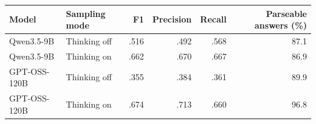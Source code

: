 {\fontsize{8.5}{9.5}\selectfont\setlength{\tabcolsep}{5pt}
\par\begin{tabularx}{\linewidth}{@{}Xlrrrr@{}}\toprule
Model & Sampling mode & F1 & Precision & Recall & Parseable answers (\%)\\\midrule
\rowcolor{blue!4}Qwen3.5-9B & Thinking off & .516 & .492 & .568 & 87.1\\
\rowcolor{blue!4}Qwen3.5-9B & Thinking on & .662 & .670 & .667 & 86.9\\
\rowcolor{orange!6}GPT-OSS-120B & Thinking off & .355 & .384 & .361 & 89.9\\
\rowcolor{orange!6}GPT-OSS-120B & Thinking on & .674 & .713 & .660 & 96.8\\\bottomrule
\end{tabularx}}
